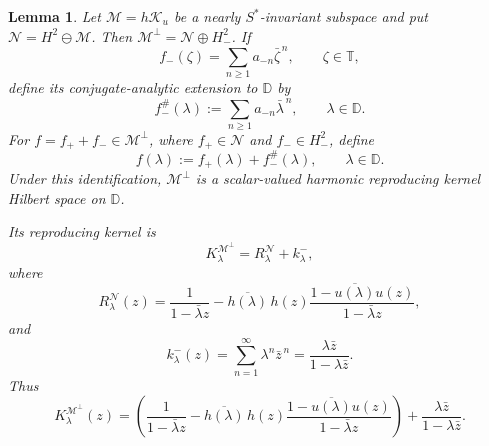 \documentclass[12pt]{amsart}
\newtheorem{lemma}[theorem]{Lemma}
\theoremstyle{definition}
\theoremstyle{remark}
\def \D{\mathbb{D}}
\def \T{\mathbb{T}}
\newcommand{\clm}{\mathcal{M}}
\newcommand{\cln}{\mathcal{N}}
\newcommand{\clk}{\mathcal{K}}
\numberwithin{equation}{section}
\begin{document}
\begin{lemma}\label{lem:RKHS}
Let $\clm=h\clk_u$ be a nearly $S^*$-invariant subspace and put $\cln=H^2\ominus\clm$. Then $\clm^\perp=\cln\oplus H_{-}^2$.
If
\[
f_{-}(\zeta)
= \sum_{n\geq1}a_{-n}\bar\zeta^{\,n},\qquad \zeta\in\T,
\]
define its conjugate-analytic extension to $\D$ by
\[
f_{-}^\#(\lambda)
:=\sum_{n\geq1}a_{-n}\bar\lambda^{\,n},\qquad \lambda\in\D.
\]
For $f=f_{+}+f_{-}\in\clm^\perp$, where
$f_{+}\in\cln$ and $f_{-}\in H_{-}^2$, define
\[
f(\lambda)
:=f_{+}(\lambda)+f_{-}^\#(\lambda),\qquad \lambda\in\D.
\]
Under this identification, $\clm^\perp$ is a scalar-valued harmonic reproducing kernel Hilbert space on $\D$.

Its reproducing kernel is
\[
K_\lambda^{\clm^\perp}
=
R_\lambda^\cln+k_\lambda^-,
\]
where
\[
R_\lambda^\cln(z)
=
\frac{1}{1-\bar\lambda z}
-
\overline{h(\lambda)}\,h(z)
\frac{1-\overline{u(\lambda)}u(z)}{1-\bar\lambda z},
\]
and
\[
k_\lambda^-(z)
= \sum_{n=1}^{\infty}\lambda^n\bar z^{\,n}
= \frac{\lambda\bar z}{1-\lambda\bar z}.
\]
Thus
\[
K_\lambda^{\clm^\perp}(z)
= \left(\frac{1}{1-\bar\lambda z}-\overline{h(\lambda)}\,h(z)
\frac{1-\overline{u(\lambda)}u(z)}{1-\bar\lambda z}\right)
+\frac{\lambda\bar z}{1-\lambda\bar z}.
\]
\end{lemma}
\end{document}
